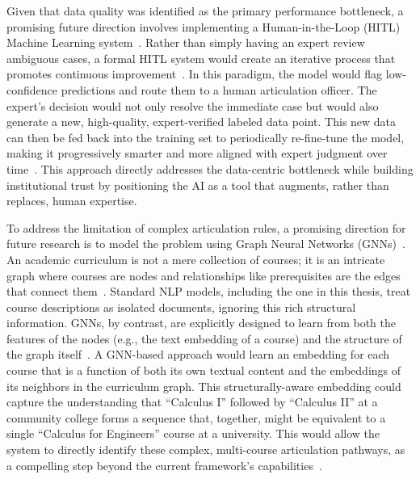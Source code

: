 Given that data quality was identified as the primary performance bottleneck, a promising future direction involves implementing a Human-in-the-Loop (HITL) Machine Learning system~\cite{WU2022364}. Rather than simply having an expert review ambiguous cases, a formal HITL system would create an iterative process that promotes continuous improvement~\cite{10.5555/3061053.3061219,wang2019}. In this paradigm, the model would flag low-confidence predictions and route them to a human articulation officer. The expert's decision would not only resolve the immediate case but would also generate a new, high-quality, expert-verified labeled data point. This new data can then be fed back into the training set to periodically re-fine-tune the model, making it progressively smarter and more aligned with expert judgment over time~\cite{Settles2009ActiveLL,wang2022humanintheloopmachinelearningmacromicro}. This approach directly addresses the data-centric bottleneck while building institutional trust by positioning the AI as a tool that augments, rather than replaces, human expertise.

To address the limitation of complex articulation rules, a promising direction for future research is to model the problem using Graph Neural Networks (GNNs)~\cite{kipf2017semisupervisedclassificationgraphconvolutional, hamilton2018inductiverepresentationlearninglarge}. An academic curriculum is not a mere collection of courses; it is an intricate graph where courses are nodes and relationships like prerequisites are the edges that connect them~\cite{zhang2023curriculum, wang2025generativecontrastiveheterogeneousgraphneural}. Standard NLP models, including the one in this thesis, treat course descriptions as isolated documents, ignoring this rich structural information. GNNs, by contrast, are explicitly designed to learn from both the features of the nodes (e.g., the text embedding of a course) and the structure of the graph itself~\cite{veličković2018graphattentionnetworks, s23084168}. A GNN-based approach would learn an embedding for each course that is a function of both its own textual content and the embeddings of its neighbors in the curriculum graph. This structurally-aware embedding could capture the understanding that ``Calculus I'' followed by ``Calculus II'' at a community college forms a sequence that, together, might be equivalent to a single ``Calculus for Engineers'' course at a university. This would allow the system to directly identify these complex, multi-course articulation pathways, as a compelling step beyond the current framework's capabilities~\cite{Yan_2024, zhang2023curriculum}.

